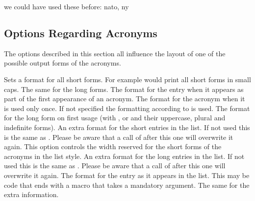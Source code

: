 \documentclass{acro-manual}
\newcommand*\nato{\ac{nato}}
\newcommand*\ny{\ac{ny}}
\begin{document}
\begin{example}
  we could have used these before: \nato, \ny
\end{example}

\subsection{Options Regarding Acronyms}\label{sec:opti-regard-acronyms}
The options described in this section all influence the layout of one of the
possible output forms of the acronyms.
\begin{options}
  \Default
    Sets a format for all short forms. For example
     would print all short forms in small
    caps.
  \Default
    The same for the long forms.
  \Default
    The format for the  entry when it appears as part of the
    first appearance of an acronym.
  \Default
    The format for the acronym when it is used only once.  If not specified
    the formatting according to  is used.
  \Default
    The format for the long form on first usage (with ,  or
     and their uppercase, plural and indefinite forms).
  \Default
    An extra format for the short entries in the list.  If not used this is
    the same as .  Please be aware that a call of
     after this one will overwrite it again.
  \Default{3em}
    This option controls the width reserved for the short
    forms of the acronyms in the  list style.
  \Default
    An extra format for the long entries in the list.  If not used this is the
    same as .  Please be aware that a call of
     after this one will overwrite it again.
    \label{key:list-foreign-format}The format for the  entry
    as it appears in the list.  This may be code that ends with a macro that
    takes a mandatory argument.
  \Default
    The same for the extra information.
\end{options}
\end{document}
